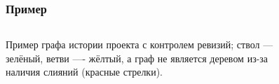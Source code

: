 \documentclass[aspectratio=169]{beamer}
\begin{document}
\begin{frame}
\frametitle{Пример}
\medskip
\begin{columns}
Пример графа истории проекта с контролем ревизий; ствол --- зелёный, ветви ---- жёлтый, а граф не является деревом из-за наличия слияний (красные стрелки).
\begin{figure}
\centering
{}
\end{figure}
\end{columns}
\end{frame}
\end{document}

